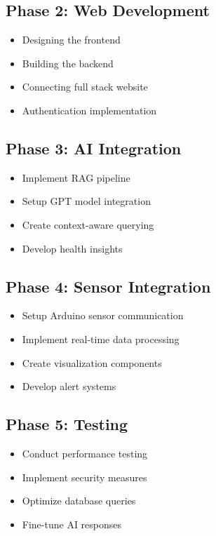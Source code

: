 \subsection{Phase 2: Web Development}
\begin{itemize}
    \item Designing the frontend
    \item Building the backend
    \item Connecting full stack website
    \item Authentication implementation
\end{itemize}

\subsection{Phase 3: AI Integration}
\begin{itemize}
    \item Implement RAG pipeline
    \item Setup GPT model integration
    \item Create context-aware querying
    \item Develop health insights
\end{itemize}

\subsection{Phase 4: Sensor Integration}
\begin{itemize}
    \item Setup Arduino sensor communication
    \item Implement real-time data processing
    \item Create visualization components
    \item Develop alert systems
\end{itemize}

\subsection{Phase 5: Testing}
\begin{itemize}
    \item Conduct performance testing
    \item Implement security measures
    \item Optimize database queries
    \item Fine-tune AI responses
\end{itemize}

